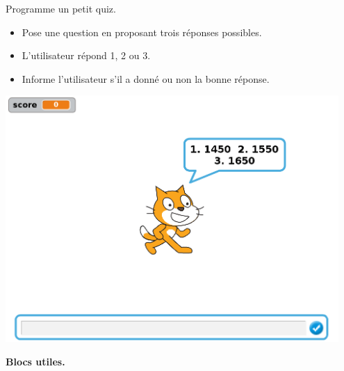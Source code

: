 \documentclass[class=report,crop=false, 12pt]{standalone}
\begin{document}




\bigskip
\bigskip

\begin{activite}

Programme un petit quiz.

\begin{itemize}
  \item Pose une question en proposant trois réponses possibles. 
  \item L'utilisateur répond 1, 2 ou 3.
  \item Informe l'utilisateur s'il a donné ou non la bonne réponse.
\end{itemize}



\begin{center}
  \includegraphics[width=0.95\textwidth]{ecran-07-ex1} 
\end{center}


\bigskip

\textbf{Blocs utiles.}

\begin{center}
\begin{scratch}
  {\blockspace}
  {\blockspace}
\end{scratch}
\end{center} 
  

\end{activite}
\end{document}
